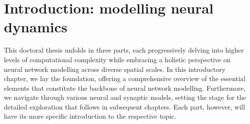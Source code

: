 \documentclass[../main.tex]{subfiles}
\begin{document}
\chapter{Introduction: modelling neural dynamics}
This doctoral thesis unfolds in three parts, each progressively delving into higher levels of computational complexity while embracing a holistic perspective on neural network modelling across diverse spatial scales.
In this introductory chapter, we lay the foundation, offering a comprehensive overview of the essential elements that constitute the backbone of neural network modelling.
Furthermore, we navigate through various neural and synaptic models, setting the stage for the detailed exploration that follows in subsequent chapters.
Each part, however, will have its more specific introduction to the respective topic.





\printbibliography
\end{document}
